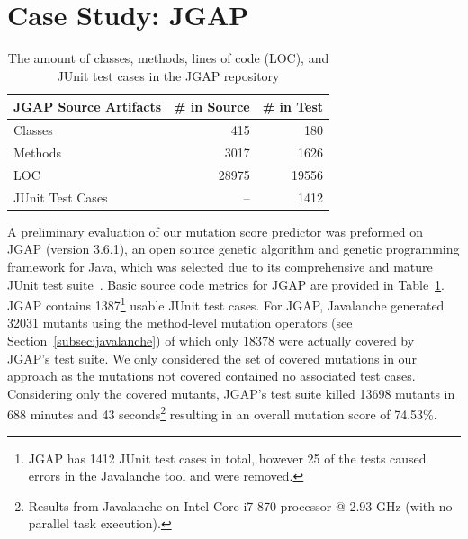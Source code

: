 \documentclass[10pt,conference,compsocconf]{IEEEtran}
\begin{document}
\section{Case Study: JGAP}
\label{sec:case_study}
\begin{table}[!t]
  \caption{The amount of classes, methods, lines of code (LOC), and JUnit test cases in the JGAP repository}
  \centering
  \begin{tabular}{|l|r|r|}
    \hline
    \rowcolor[RGB]{169,196,223}
    \textbf{JGAP Source Artifacts} & \textbf{\# in Source} & \textbf{\# in Test} \\
    \hline Classes & 415 & 180 \\
    \hline Methods & 3017 & 1626 \\
    \hline LOC & 28975 & 19556 \\
    \hline JUnit Test Cases & -- & 1412\footnotemark[1] \\
    \hline
  \end{tabular}
  \label{tab:jgap_source_stats}
\end{table}

A preliminary evaluation of our mutation score predictor was preformed on JGAP (version 3.6.1), an open source genetic algorithm and genetic programming framework for Java, which was selected due to its comprehensive and mature JUnit test suite~\cite{JGAP}. Basic source code metrics for JGAP are provided in Table~\ref{tab:jgap_source_stats}. JGAP contains 1387\footnote{JGAP has 1412 JUnit test cases in total, however 25 of the tests caused errors in the Javalanche tool and were removed.} usable JUnit test cases. For JGAP, Javalanche generated 32031 mutants using the method-level mutation operators (see Section~\ref{subsec:javalanche}) of which only 18378 were actually covered by JGAP's test suite. We only considered the set of covered mutations in our approach as the mutations not covered contained no associated test cases. Considering only the covered mutants, JGAP's test suite killed 13698 mutants in 688 minutes and 43 seconds\footnote{Results from Javalanche on Intel Core i7-870 processor @ 2.93 GHz (with no parallel task execution).} resulting in an overall mutation score of 74.53\%.
\end{document}
